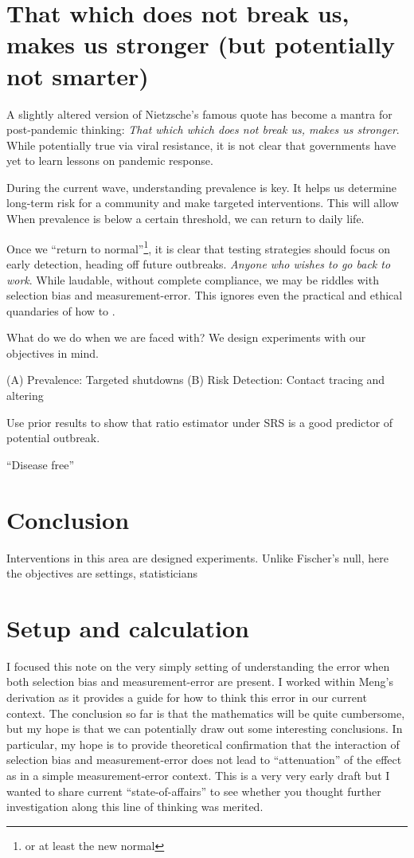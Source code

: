 \documentclass[12pt]{article}
\numberwithin{equation}{section}
\theoremstyle{plain}
\begin{document}
\section{That which does not break us, makes us stronger (but potentially not smarter)}

A slightly altered version of Nietzsche's famous quote has become a mantra for post-pandemic thinking: \emph{That which which does not break us, makes us stronger}.  While potentially true via viral resistance, it is not clear that governments have yet to learn lessons on pandemic response.

During the current wave, understanding prevalence is key.  It helps us determine long-term risk for a community and make targeted interventions.  This will allow
When prevalence is below a certain threshold, we can return to daily life.

Once we ``return to normal''\footnote{or at least the new normal}, it is clear that testing strategies should focus on early detection, heading off future outbreaks.
\emph{Anyone who wishes to go back to work}.  While laudable, without complete compliance, we may be riddles with selection bias and measurement-error.  This ignores even the practical and ethical quandaries of how to .

What do we do when we are faced with?  We design experiments with our objectives in mind.

(A) Prevalence: Targeted shutdowns
(B) Risk Detection: Contact tracing and altering

Use prior results to show that ratio estimator under SRS is a good predictor of potential outbreak.

``Disease free''

\section{Conclusion}

Interventions in this area are designed experiments.  Unlike Fischer's null, here the objectives are settings, statisticians

\appendix

\section{Setup and calculation}

I focused this note on the very simply setting of understanding the error when both selection bias and measurement-error are present.  I worked within Meng's derivation as it provides a guide for how to think this error in our current context.  The conclusion so far is that the mathematics will be quite cumbersome, but my hope is that we can potentially draw out some interesting conclusions.  In particular, my hope is to provide theoretical confirmation that the interaction of selection bias and measurement-error does not lead to ``attenuation'' of the effect as in a simple measurement-error context. This is a very very early draft but I wanted to share current ``state-of-affairs'' to see whether you thought further investigation along this line of thinking was merited.
\end{document}
